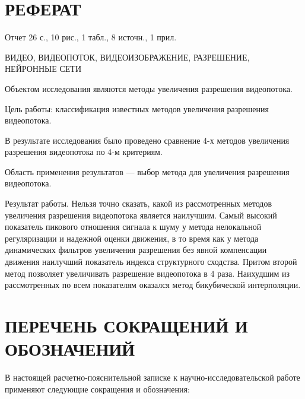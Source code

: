 \documentclass{bmstu}
\begin{document}


\setcounter{page}{3}

{\centering \chapter*{РЕФЕРАТ}}

Отчет 26 с., 10 рис., 1 табл., 8 источн., 1 прил.

\noindent ВИДЕО, ВИДЕОПОТОК, ВИДЕОИЗОБРАЖЕНИЕ, РАЗРЕШЕНИЕ, НЕЙРОННЫЕ СЕТИ

Объектом исследования являются методы увеличения разрешения видеопотока.

Цель работы: классификация известных методов увеличения разрешения видеопотока.

В результате исследования было проведено сравнение 4-х методов увеличения разрешения видеопотока по 4-м критериям.

Область применения результатов --- выбор метода для увеличения разрешения видеопотока.

Результат работы. 
Нельзя точно сказать, какой из рассмотренных методов увеличения разрешения видеопотока является наилучшим. 
Самый высокий показатель пикового отношения сигнала к шуму у метода нелокальной регуляризации и надежной оценки движения, в то время как у метода динамических фильтров увеличения разрешения без явной компенсации движения наилучший показатель индекса структурного сходства. 
Притом второй метод позволяет увеличивать разрешение видеопотока в 4 раза. 
Наихудшим из рассмотренных по всем показателям оказался метод бикубической интерполяции.

\maketableofcontents

{\centering \chapter*{ПЕРЕЧЕНЬ СОКРАЩЕНИЙ И ОБОЗНАЧЕНИЙ}}

В настоящей расчетно-пояснительной записке к научно-исследовательской работе применяют следующие сокращения и обозначения:
\end{document}
